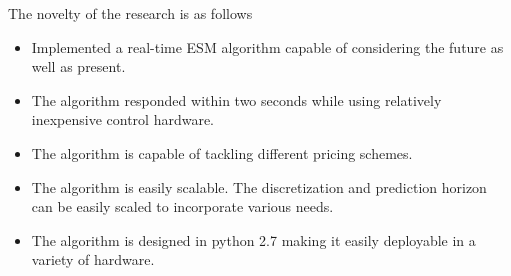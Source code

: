 The novelty of the research is as follows
\begin{itemize}
    \item Implemented a real-time ESM algorithm capable of considering the future as well as present.
    \item The algorithm responded within two seconds while using relatively inexpensive control hardware.
    \item The algorithm is capable of tackling different pricing schemes.
    \item The algorithm is easily scalable. The discretization and prediction horizon can be easily scaled to incorporate various needs.
    \item The algorithm is designed in python 2.7 making it easily deployable in a variety of hardware.
\end{itemize}
